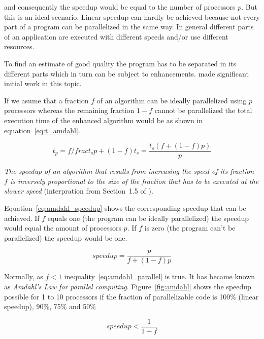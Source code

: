 and consequently the speedup would be equal to the number of
processors $p$.
But this is an ideal scenario. Linear speedup can hardly be achieved
because not every part of a program can be parallelized in the same
way. In general different parts of an application are executed with
different speeds and/or use different resources.

To find an estimate of good quality the program has to be separated in its
different parts which in turn can be subject to
enhancements. \cite{amdahl67vsp} made significant initial work in this
topic.

If we asume that a fraction $f$ of an algorithm can be ideally
parallelized using $p$ processors whereas the remaining fraction $1 -
f$ cannot be 
parallelized the total execution time of the enhanced algorithm would
be as shown in equation~\ref{eq:t_amdahl}.

\begin{equation}
\label{eq:t_amdahl}
t_p = f /frac{t_s}{p} + (1 - f) t_s = \frac{t_s ( f + ( 1 - f) p )}{p}
\end{equation}

\textit{The speedup of an algorithm that results from increasing the speed of
its fraction $f$ is inversely proportional to the size of the fraction
that has to be executed at the slower speed} (interpration from
Section~1.5 of \cite{kontoghiorghes06handbookpcstat}).

Equation~\ref{eq:amdahl_speedup} shows the corresponding speedup that
can be achieved. If $f$ equals one (the program can be ideally
parallelized) the speedup would equal the amount of processors $p$. If
$f$ is zero (the program can't be parallelized) the speedup would be
one. 

\begin{equation}
\label{eq:amdahl_speedup}
speedup = \frac{p}{f + (1 - f)p}
\end{equation}

Normally, as $f < 1$ inequality~\ref{eq:amdahl_parallel} is true. It
has became known as \textit{Amdahl's Law for parallel
  computing}. Figure~\ref{fig:amdahl} shows the speedup possible for 1
to 10 processors if
the fraction of parallelizable code is 100\% (linear speedup), 90\%,
75\% and 50\%

\begin{equation}
\label{eq:amdahl_parallel}
speedup < \frac{1}{1 - f}
\end{equation}



